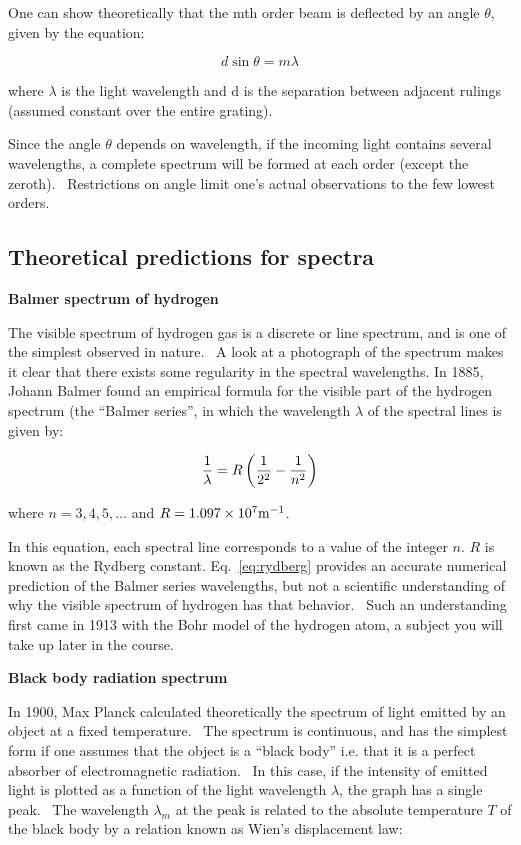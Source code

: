 One can show theoretically that the mth order beam is deflected by an
angle ${\theta}$, given by the equation: 

\begin{equation}
d \sin \theta = m \lambda
\label{eq:gratingmaxima}
\end{equation}

where ${\lambda}$ is the light wavelength and d is the separation
between adjacent rulings (assumed constant over the entire grating). 


Since the angle ${\theta}$ depends on wavelength, if the incoming light
contains several wavelengths, a complete spectrum will be formed at
each order (except the zeroth). \ Restrictions on angle limit
one's actual observations to the few lowest orders.

\subsection{Theoretical predictions for spectra}

\noindent\textbf{Balmer spectrum of hydrogen}

The visible spectrum of hydrogen gas is a discrete or line spectrum, and
is one of the simplest observed in nature. \ A look at a photograph of
the spectrum makes it clear that there exists some regularity in the
spectral wavelengths. In 1885, Johann Balmer found an empirical formula
for the visible part of the hydrogen spectrum (the
``Balmer series'', in which the wavelength
${\lambda}$ of the spectral lines is given by:

\begin{equation}
{1 \over \lambda} = R \left( {1 \over 2^2} - {1 \over n^2} \right)
\label{eq:rydberg}
\end{equation}

where $n = 3, 4, 5,\ldots$ and $ R = 1.097 \times 10^7 {\rm m}^{-1}$.

In this equation, each spectral line corresponds to a value of the 
integer $n$.  $R$ is known as the Rydberg constant.  Eq.~\ref{eq:rydberg} provides
an accurate numerical prediction of the Balmer series wavelengths, but
not a scientific understanding of why the visible spectrum of hydrogen
has that behavior. \ Such an understanding first came in 1913 with the
Bohr model of the hydrogen atom, a subject you will take up later in
the course.

\noindent\textbf{Black body radiation spectrum}

In 1900, Max Planck calculated theoretically the spectrum of light
emitted by an object at a fixed temperature. \ The spectrum is
continuous, and has the simplest form if one assumes that the object is
a ``black body'' i.e. that it is a
perfect absorber of electromagnetic radiation. \ In this case, if the
intensity of emitted light is plotted as a function of the light
wavelength ${\lambda}$, the graph has a single peak. \ The wavelength
${\lambda}_m$ at the peak is related to the absolute
temperature $T$ of the black body by a relation known as
Wien's displacement law:

